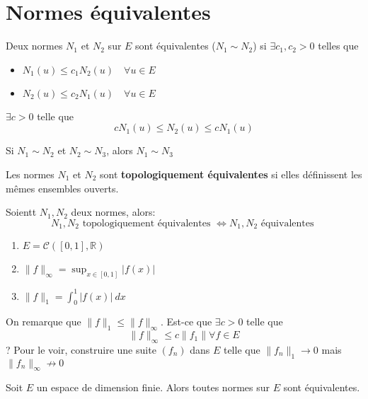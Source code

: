 \documentclass[a4paper]{report}
\newcommand\R{\ensuremath{\mathbb{R}}}
\let\iff\Leftrightarrow
\theoremstyle{definition}
\begin{document}
\section{Normes équivalentes}
\begin{definition}
    Deux normes $N_1$ et  $N_2$ sur  $E$ sont équivalentes ($N_1 \sim N_2$) si $\exists c_1, c_2 > 0$ telles que 
    \begin{itemize}
        \item $N_1(u) \le c_1N_2(u) \quad \forall u \in E$
        \item $N_2(u) \le c_2N_1(u) \quad \forall u \in E$
    \end{itemize}
    $\exists c > 0$ telle que
    \[
    cN_1(u) \le N_2(u) \le cN_1(u)
    \] 
\end{definition}
\begin{remark}
   Si  $N_1 \sim N_2$ et $N_2 \sim N_3$, alors $N_1 \sim N_3$ 
\end{remark}
\begin{definition}
    Les normes $N_1$ et $N_2$ sont \textbf{topologiquement équivalentes} si elles définissent les mêmes ensembles ouverts.
\end{definition}
\begin{theorem}
    Soientt $N_1, N_2$ deux normes, alors:
    \[
    N_1, N_2 \text{ topologiquement équivalentes } \iff N_1, N_2 \text{ équivalentes }
    \] 
\end{theorem}
\begin{eg}
    \begin{enumerate}
        \item $E = \mathcal{C}([0, 1], \R)$
        \item $\|f\|_{\infty} = \sup_{x \in [0, 1]}|f(x)|$
        \item $\|f\|_1 = \int_{{0}}^{{1}} {|f(x)|} \: d{x}$
    \end{enumerate}
    On remarque que $\|f\|_1 \le \|f\|_{\infty}$. Est-ce que $\exists c > 0$ telle que 
    \[
    \|f\|_{\infty} \le c\|f_1\| \forall f \in E
    \] 
    ?
    Pour le voir, construire une suite $(f_n)$ dans  $E$ telle que  $\|f_n\|_1 \to 0$ mais $\|f_n\|_{\infty} \not\to 0$
\end{eg}
\begin{theorem}
    Soit $E$ un espace de dimension finie. Alors toutes normes sur  $E$ sont équivalentes.
\end{theorem}
\end{document}
